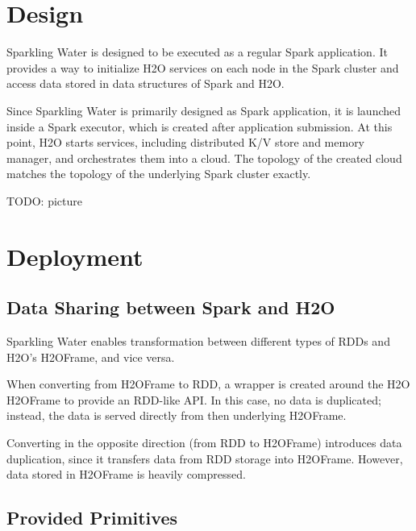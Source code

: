 \section{Design}
Sparkling Water is designed to be executed as a regular Spark application. It provides a way to initialize H2O services on each node in the Spark cluster and access data stored in data structures of Spark and H2O.

Since Sparkling Water is primarily designed as Spark application, it is launched
inside a Spark executor, which is created after application submission. At this
point, H2O starts services, including distributed K/V store and memory manager, and orchestrates them into a cloud. The topology of the created cloud matches the topology of the underlying Spark cluster exactly.

TODO: picture

\section{Deployment}

\subsection{Data Sharing between Spark and H2O}

Sparkling Water enables transformation between different types of RDDs and H2O's H2OFrame, and vice versa.

When converting from H2OFrame to RDD, a wrapper is created around the H2O H2OFrame to provide an RDD-like API. In this case, no data is duplicated; instead, the data is served directly from then underlying H2OFrame.

Converting in the opposite direction (from RDD to H2OFrame) introduces data duplication, since it transfers data from RDD storage into H2OFrame. However, data stored in H2OFrame is heavily compressed.

\subsection{Provided Primitives}

